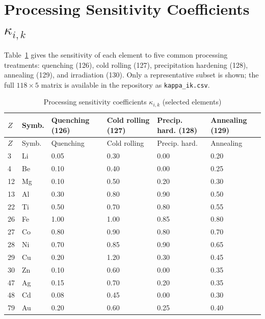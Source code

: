 \documentclass[12pt,a4paper]{article}
\begin{document}
	\section{Processing Sensitivity Coefficients $\kappa_{i,k}$}
	Table~\ref{tab:kappa_ik} gives the sensitivity of each element to five common processing treatments: quenching (126), cold rolling (127), precipitation hardening (128), annealing (129), and irradiation (130). Only a representative subset is shown; the full $118\times5$ matrix is available in the repository as \texttt{kappa\_ik.csv}.
	
	\begin{longtable}{p{1.8cm} p{1.2cm} p{1.2cm} p{1.2cm} p{1.2cm} p{1.2cm}}
		\caption{Processing sensitivity coefficients $\kappa_{i,k}$ (selected elements)}\label{tab:kappa_ik}\\
		\toprule
		$Z$ & Symb. & Quenching (126) & Cold rolling (127) & Precip. hard. (128) & Annealing (129) \\
		\midrule
		\endfirsthead
		\toprule
		$Z$ & Symb. & Quenching & Cold rolling & Precip. hard. & Annealing \\
		\midrule
		\endhead
		3  & Li  & 0.05 & 0.30 & 0.00 & 0.20 \\
		4  & Be  & 0.10 & 0.40 & 0.00 & 0.25 \\
		12 & Mg  & 0.10 & 0.50 & 0.20 & 0.30 \\
		13 & Al  & 0.30 & 0.80 & 0.90 & 0.50 \\
		22 & Ti  & 0.50 & 0.70 & 0.80 & 0.55 \\
		26 & Fe  & 1.00 & 1.00 & 0.85 & 0.80 \\
		27 & Co  & 0.80 & 0.90 & 0.80 & 0.70 \\
		28 & Ni  & 0.70 & 0.85 & 0.90 & 0.65 \\
		29 & Cu  & 0.20 & 1.20 & 0.30 & 0.45 \\
		30 & Zn  & 0.10 & 0.60 & 0.00 & 0.35 \\
		47 & Ag  & 0.15 & 0.70 & 0.20 & 0.35 \\
		48 & Cd  & 0.08 & 0.45 & 0.00 & 0.30 \\
		79 & Au  & 0.20 & 0.60 & 0.25 & 0.40 \\
		\bottomrule
	\end{longtable}
	
	
\end{document}
